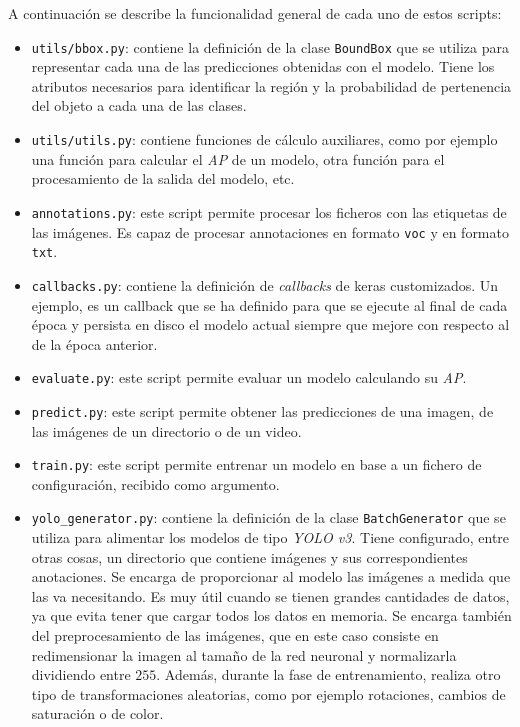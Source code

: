A continuación se describe la funcionalidad general de cada uno de estos scripts:

\begin{itemize}
	\item \texttt{utils/bbox.py}: contiene la definición de la clase \texttt{BoundBox} que se utiliza para representar cada una de las predicciones obtenidas con el modelo. Tiene los atributos necesarios para identificar la región y la probabilidad de pertenencia del objeto a cada una de las clases.
	\item \texttt{utils/utils.py}: contiene funciones de cálculo auxiliares, como por ejemplo una función para calcular el \textit{AP} de un modelo, otra función para el procesamiento de la salida del modelo, etc.
	\item \texttt{annotations.py}: este script permite procesar los ficheros con las etiquetas de las imágenes. Es capaz de procesar annotaciones en formato \texttt{voc} y en formato \texttt{txt}.
	\item \texttt{callbacks.py}: contiene la definición de \textit{callbacks} de keras customizados. Un ejemplo, es un callback que se ha definido para que se ejecute al final de cada época y persista en disco el modelo actual siempre que mejore con respecto al de la época anterior.
	\item \texttt{evaluate.py}: este script permite evaluar un modelo calculando su \textit{AP}.
	\item \texttt{predict.py}: este script permite obtener las predicciones de una imagen, de las imágenes de un directorio o de un video.
	\item \texttt{train.py}: este script permite entrenar un modelo en base a un fichero de configuración, recibido como argumento.
	\item \texttt{yolo\_generator.py}: contiene la definición de la clase \texttt{BatchGenerator} que se utiliza para alimentar los modelos de tipo \textit{YOLO v3}. Tiene configurado, entre otras cosas, un directorio que contiene imágenes y sus correspondientes anotaciones. Se encarga de proporcionar al modelo las imágenes a medida que las va necesitando. Es muy útil cuando se tienen grandes cantidades de datos, ya que evita tener que cargar todos los datos en memoria. Se encarga también del preprocesamiento de las imágenes, que en este caso consiste en redimensionar la imagen al tamaño de la red neuronal y normalizarla dividiendo entre $255$. Además, durante la fase de entrenamiento, realiza otro tipo de transformaciones aleatorias, como por ejemplo rotaciones, cambios de saturación o de color.

\end{itemize}
